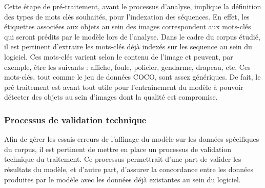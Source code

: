 Cette étape de pré-traitement, avant le processus d'analyse, implique la définition des types de mots clés souhaités, pour l'indexation des séquences. En effet, les étiquettes associées aux objets au sein des images correspondent aux mots-clés qui seront prédits par le modèle lors de l’analyse. Dans le cadre du corpus étudié, il est pertinent d’extraire les mots-clés déjà indexés sur les \gls{sequence} au sein du logiciel. Ces mots-clés varient selon le contenu de l’image et peuvent, par exemple, être les suivants : affiche, foule, policier, gendarme, drapeau, etc. Ces mots-clés, tout comme le jeu de données COCO, sont assez génériques. De fait, le pré traitement est avant tout utile pour l’entraînement du modèle à pouvoir détecter des objets au sein d’images dont la qualité est compromise.   


\subsubsection{Processus de validation technique}


Afin de gérer les essais-erreurs de l'affinage du modèle sur les données spécifiques du corpus, il est pertinent de mettre en place un processus de validation technique du traitement. Ce processus permettrait d'une part de valider les résultats du modèle, et d’autre part, d'assurer la concordance entre les données produites par le modèle avec les données déjà existantes au sein du logiciel.

